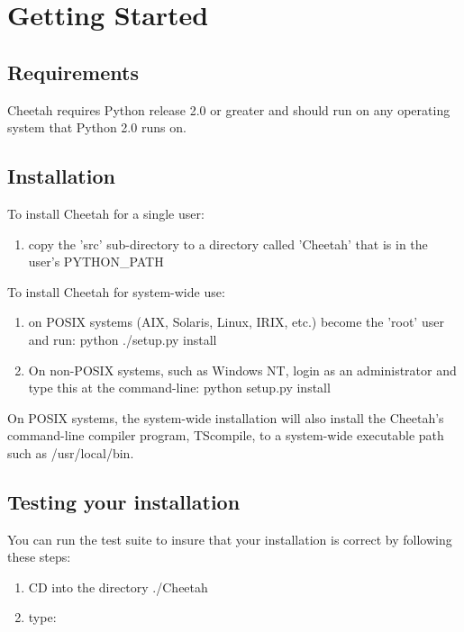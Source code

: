 \section{Getting Started}
\label{gettingStarted}

\subsection{Requirements}
Cheetah requires Python release 2.0 or greater and should run on any
operating system that Python 2.0 runs on.

\subsection{Installation}

To install Cheetah for a single user:
\begin{enumerate}
\item copy the 'src' sub-directory to a directory called 'Cheetah' that is in the
     user's PYTHON_PATH

\end{enumerate}

To install Cheetah for system-wide use:
\begin{enumerate}
\item on POSIX systems (AIX, Solaris, Linux, IRIX, etc.) become the 'root' user
     and run: python ./setup.py install
     
\item On non-POSIX systems, such as Windows NT, login as an administrator and
     type this at the command-line:  python setup.py install
\end{enumerate}


On POSIX systems, the system-wide installation will also install the Cheetah's
command-line compiler program, TScompile, to a system-wide executable path such as
/usr/local/bin.

\subsection{Testing your installation}
You can run the test suite to insure that your installation is correct by
following these steps:
\begin{enumerate}
\item CD into the directory ./Cheetah   
\item type:  
\end{enumerate}

